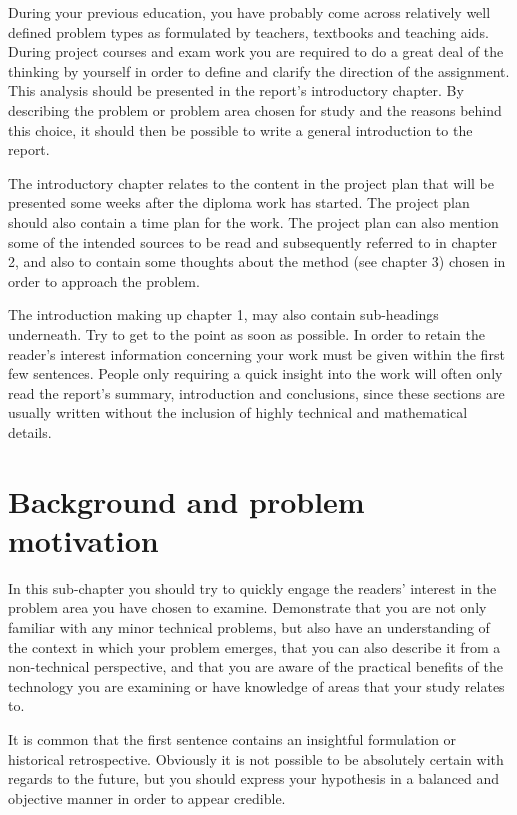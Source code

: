 During your previous education, you have probably come across
relatively well defined problem types as formulated by teachers,
textbooks and teaching aids. During project courses and exam work you
are required to do a great deal of the thinking by yourself in order to
define and clarify the direction of the assignment. This analysis should
be presented in the report's introductory chapter. By describing the
problem or problem area chosen for study and the reasons behind this
choice, it should then be possible to write a general introduction to the
report.

The introductory chapter relates to the content in the project plan that
will be presented some weeks after the diploma work has started. The
project plan should also contain a time plan for the work. The project
plan can also mention some of the intended sources to be read and
subsequently referred to in chapter 2, and also to contain some thoughts
about the method (see chapter 3) chosen in order to approach the
problem.

The introduction making up chapter 1, may also contain sub-headings
underneath. Try to get to the point as soon as possible. In order to retain
the reader’s interest information concerning your work must be given
within the first few sentences. People only requiring a quick insight into
the work will often only read the report's summary, introduction and
conclusions, since these sections are usually written without the
inclusion of highly technical and mathematical details. 
\section{Background and problem motivation}
In this sub-chapter you should try to quickly engage the readers' interest
in the problem area you have chosen to examine. Demonstrate that you
are not only familiar with any minor technical problems, but also have
an understanding of the context in which your problem emerges, that
you can also describe it from a non-technical perspective, and that you
are aware of the practical benefits of the technology you are examining
or have knowledge of areas that your study relates to.

It is common that the first sentence contains an insightful formulation or
historical retrospective. Obviously it is not possible to be absolutely 
certain with regards to the future, but you should express your
hypothesis in a balanced and objective manner in order to appear
credible.

